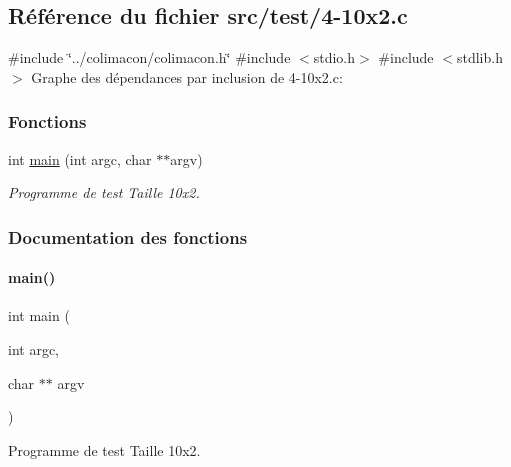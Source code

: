 \hypertarget{4-10x2_8c}{}\subsection{Référence du fichier src/test/4-\/10x2.c}
\label{4-10x2_8c}
{\ttfamily \#include \char`\"{}../colimacon/colimacon.\+h\char`\"{}}\newline
{\ttfamily \#include $<$stdio.\+h$>$}\newline
{\ttfamily \#include $<$stdlib.\+h$>$}\newline
Graphe des dépendances par inclusion de 4-\/10x2.c\+:
\subsubsection*{Fonctions}
\begin{DoxyCompactItemize}
\item 
int \hyperlink{4-10x2_8c_a3c04138a5bfe5d72780bb7e82a18e627}{main} (int argc, char $\ast$$\ast$argv)
\begin{DoxyCompactList}\small\item\em Programme de test Taille 10x2. \end{DoxyCompactList}\end{DoxyCompactItemize}


\subsubsection{Documentation des fonctions}
\mbox{\label{4-10x2_8c_a3c04138a5bfe5d72780bb7e82a18e627}} 
\paragraph{\texorpdfstring{main()}{main()}}
{\footnotesize\ttfamily int main (\begin{DoxyParamCaption}\item[{int}]{argc,  }\item[{char $\ast$$\ast$}]{argv }\end{DoxyParamCaption})}



Programme de test Taille 10x2. 

